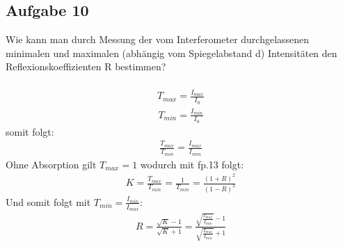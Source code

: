 \documentclass[a4paper,10pt]{scrartcl}
\begin{document}
	\subsection{Aufgabe 10}
	Wie kann man durch Messung der vom Interferometer durchgelassenen minimalen und maximalen
	(abhängig vom Spiegelabstand d) Intensitäten den Reflexionskoeffizienten
	R bestimmen?\\
	\\
	\begin{align*}
	T_{max}=\frac{I_{max}}{I_{0}}
	\end{align*}
	\begin{align*}
	T_{min}=\frac{I_{min}}{I_{0}}
	\end{align*}
	somit folgt:
	\begin{align*}
	\frac{T_{max}}{T_{min}}=\frac{I_{max}}{I_{min}}
	\end{align*}
	Ohne Absorption gilt \(T_{max}=1\) wodurch mit fp.13 folgt:
	\begin{align*}
	K=\frac{T_{max}}{T_{min}}=\frac{1}{T_{min}}=\frac{(1+R)^{2}}{(1-R)^{2}}
	\end{align*}
	Und somit folgt mit \(T_{min}=\frac{I_{min}}{I_{max}}\):
	\begin{align*}
	R=\frac{\sqrt{K}-1}{\sqrt{K}+1}=\frac{\sqrt{\frac{I_{max}}{I_{min}}}-1}{\sqrt{\frac{I_{max}}{I_{min}}}+1}
	\end{align*}
\end{document}
